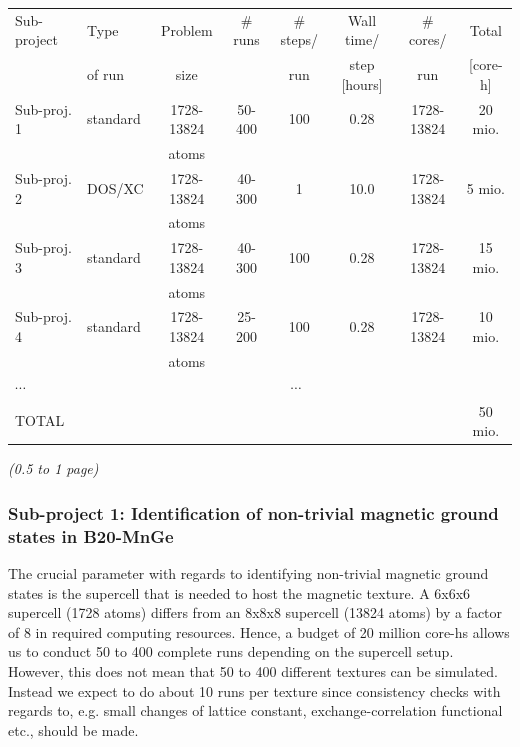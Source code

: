 \documentclass [a4paper, 12pt]{article}
\begin{document}
\begin{tabular}{llcccccc} \hline\hline
  Sub-project & 
  Type &
  Problem & 
  \# runs & 
  \# steps/ & 
  Wall time/ & 
  \# cores/ & 
  Total \\
  &
  of run &
  size  &
  &
  run &
  step [hours] &
  run &
  [core-h] \\
 \hline\hline
  Sub-proj. 1 & 
  standard &
  1728-13824 & 
  50-400 & 
  100 &
  0.28 &
  1728-13824 &
  20 mio. \\
     &
     &
    atoms & 
     & 
     &
     &
     &
     \\
  Sub-proj. 2 & 
  DOS/XC &
  1728-13824 & 
  40-300 & 
  1 &
  10.0 &
  1728-13824 &
  5 mio. \\
     &
     &
    atoms & 
     & 
     &
     &
     &
     \\
  Sub-proj. 3 & 
  standard &
  1728-13824 & 
  40-300 & 
  100 &
  0.28 &
  1728-13824 &
  15 mio. \\
     &
     &
    atoms & 
     & 
     &
     &
     &
     \\
  Sub-proj. 4 & 
  standard &
  1728-13824 & 
  25-200 & 
  100 &
  0.28 &
  1728-13824 &
  10 mio. \\
     &
     &
    atoms & 
     & 
     &
     &
     &
     \\



$\cdots$ &\multicolumn{7}{c}{$\cdots$}\\
\hline\hline
TOTAL & & & & & & & 50 mio. \\
\end{tabular}
\bigskip

\textit{(0.5 to 1 page)}

\subsubsection{Sub-project 1: Identification of non-trivial magnetic ground states in B20-MnGe}
The crucial parameter with regards to identifying non-trivial magnetic ground states is the
supercell that is needed to host the magnetic texture.
A 6x6x6 supercell (1728 atoms) differs from an 8x8x8 supercell (13824 atoms)
by a factor of 8 in required computing resources. Hence, a budget of 20 million core-hs allows
us to conduct 50 to 400 complete runs depending on the supercell setup.
However, this does not mean that 50 to 400 different textures can be simulated. Instead
we expect to do about 10 runs per texture since consistency checks with regards to, e.g.
small changes of lattice constant, exchange-correlation functional etc., should be made.
\end{document}
